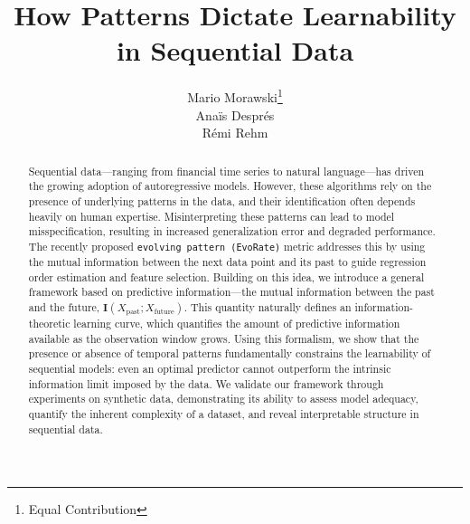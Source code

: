 \documentclass{article}
\title{How Patterns Dictate Learnability in Sequential Data}
\author{
  Mario Morawski\thanks{Equal Contribution} \\
  \And
  Anaïs Després\footnotemark[1] \\
  \AND
  Rémi Rehm \\
}
\begin{document}
\maketitle


\begin{abstract}
Sequential data—ranging from financial time series to natural language—has driven the growing adoption of autoregressive models. However, these algorithms rely on the presence of underlying patterns in the data, and their identification often depends heavily on human expertise. Misinterpreting these patterns can lead to model misspecification, resulting in increased generalization error and degraded performance. The recently proposed \texttt{evolving pattern (EvoRate)} metric addresses this by using the mutual information between the next data point and its past to guide regression order estimation and feature selection. Building on this idea, we introduce a general framework based on predictive information—the mutual information between the past and the future, $\mathbf{I}(X_{\text{past}}; X_{\text{future}})$. This quantity naturally defines an information-theoretic learning curve, which quantifies the amount of predictive information available as the observation window grows. Using this formalism, we show that the presence or absence of temporal patterns fundamentally constrains the learnability of sequential models: even an optimal predictor cannot outperform the intrinsic information limit imposed by the data. We validate our framework through experiments on synthetic data, demonstrating its ability to assess model adequacy, quantify the inherent complexity of a dataset, and reveal interpretable structure in sequential data.

\end{abstract}
\end{document}
